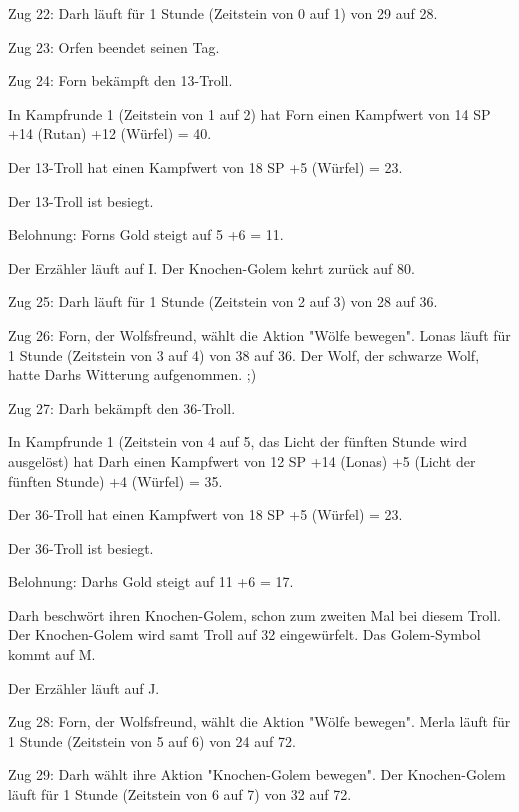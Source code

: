 \documentclass[10pt, a4paper, oneside]{book}
\begin{document}
{Zug 22: Darh läuft für 1 Stunde (Zeitstein von 0 auf 1) von 29 auf 28.



Zug 23: Orfen beendet seinen Tag.



Zug 24: Forn bekämpft den 13-Troll.

In Kampfrunde 1 (Zeitstein von 1 auf 2) hat Forn einen Kampfwert von 14 SP +14 (Rutan) +12 (Würfel) = 40.

Der 13-Troll hat einen Kampfwert von 18 SP +5 (Würfel) = 23.

Der 13-Troll ist besiegt.

Belohnung: Forns Gold steigt auf 5 +6 = 11.

Der Erzähler läuft auf I. Der Knochen-Golem kehrt zurück auf 80.



Zug 25: Darh läuft für 1 Stunde (Zeitstein von 2 auf 3) von 28 auf 36.



Zug 26: Forn, der Wolfsfreund, wählt die Aktion "Wölfe bewegen". Lonas läuft für 1 Stunde (Zeitstein von 3 auf 4) von 38 auf 36. Der Wolf, der schwarze Wolf, hatte Darhs Witterung aufgenommen. ;)



Zug 27: Darh bekämpft den 36-Troll.

In Kampfrunde 1 (Zeitstein von 4 auf 5, das Licht der fünften Stunde wird ausgelöst) hat Darh einen Kampfwert von 12 SP +14 (Lonas) +5 (Licht der fünften Stunde) +4 (Würfel) = 35.

Der 36-Troll hat einen Kampfwert von 18 SP +5 (Würfel) = 23.

Der 36-Troll ist besiegt.

Belohnung: Darhs Gold steigt auf 11 +6 = 17.

Darh beschwört ihren Knochen-Golem, schon zum zweiten Mal bei diesem Troll. Der Knochen-Golem wird samt Troll auf 32 eingewürfelt. Das Golem-Symbol kommt auf M.

Der Erzähler läuft auf J.



Zug 28: Forn, der Wolfsfreund, wählt die Aktion "Wölfe bewegen". Merla läuft für 1 Stunde (Zeitstein von 5 auf 6) von 24 auf 72.



Zug 29: Darh wählt ihre Aktion "Knochen-Golem bewegen". Der Knochen-Golem läuft für 1 Stunde (Zeitstein von 6 auf 7) von 32 auf 72.



}
\end{document}
